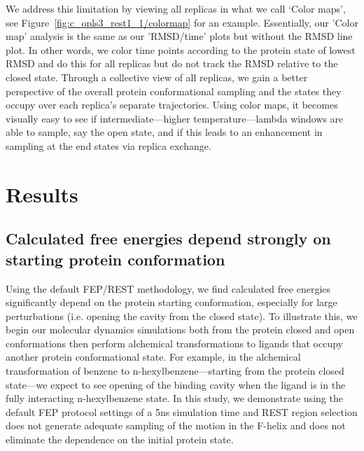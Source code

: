\documentclass[journal=jctcce,manuscript=article]{achemso}
\begin{document}
We address this limitation by viewing all replicas in what we call `Color maps', see Figure~\ref{fig:c_opls3_rest1_1/colormap} for an example.
Essentially, our 'Color map' analysis is the same as our 'RMSD/time' plots but without the RMSD line plot.
In other words, we color time points according to the protein state of lowest RMSD and do this for all replicas but do not track the RMSD relative to the closed state.
Through a collective view of all replicas, we gain a better perspective of the overall protein conformational sampling and the states they occupy over each replica's separate trajectories. 
Using color maps, it becomes visually easy to see if intermediate---higher temperature---lambda windows are able to sample, say the open state, and if this leads to an enhancement in sampling at the end states via replica exchange.

\section{Results}
\subsection*{Calculated free energies depend strongly on starting protein conformation}
Using the default FEP/REST methodology\cite{FEP/REST}, we find calculated free energies significantly depend on the protein starting conformation, especially for large perturbations (i.e. opening the cavity from the closed state).
To illustrate this, we begin our molecular dynamics simulations both from the protein closed and open conformations then perform alchemical transformations to ligands that occupy another protein conformational state.
For example, in the alchemical transformation of benzene to n-hexylbenzene---starting from the protein closed state---we expect to see opening of the binding cavity when the ligand is in the fully interacting n-hexylbenzene state.
In this study, we demonstrate using the default FEP protocol settings of a 5ns simulation time and REST region selection does not generate adequate sampling of the motion in the F-helix and does not eliminate the dependence on the initial protein state.
\end{document}
